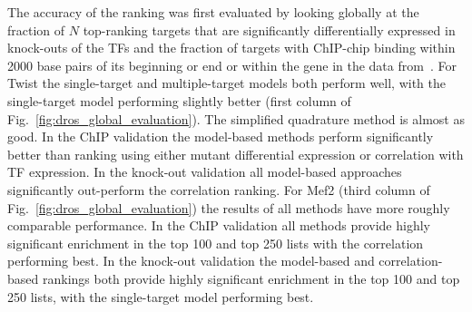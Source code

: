 \documentclass{pnastwo}
\begin{document}
\begin{article}

The accuracy of the ranking was first evaluated by looking globally at
the fraction of $N$ top-ranking targets that are significantly
differentially expressed in knock-outs of the TFs and the fraction
of targets with ChIP-chip binding within 2000 base
pairs of its beginning or end or within the gene in the data
from~\cite{Zinzen2009}. For Twist the single-target and
multiple-target models both perform well, with the single-target model
performing slightly better (first column of
Fig.~\ref{fig:dros_global_evaluation}). The simplified quadrature
method is almost as good. In the ChIP validation the
model-based methods perform significantly better than ranking
using either mutant differential expression or correlation with TF
expression. In the knock-out validation all model-based approaches
significantly out-perform the correlation ranking. For Mef2
(third column of Fig.~\ref{fig:dros_global_evaluation}) the results of all
methods have more roughly comparable performance. In the ChIP validation all
methods provide highly significant enrichment in the top 100 and top
250 lists with the correlation performing best. In the knock-out
validation the model-based and correlation-based rankings both provide
highly significant enrichment in the top 100 and top 250 lists, with
the single-target model performing best.



\end{article}
\end{document}
